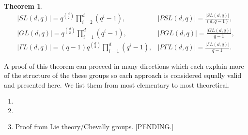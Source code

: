 \documentclass[12pt]{article}
\newtheorem{thm}{Theorem}
\begin{document}
\begin{thm}\label{thm:lin}
\[
\begin{array}{cc}
|SL(d,q)| = q^{\binom{d}{2}} \prod_{i=2}^d (q^i-1), 
  & |PSL(d,q)|=\frac{|SL(d,q)|}{(d,q-1)},\\
|GL(d,q)|  =  q^{\binom{d}{2}} \prod_{i=1}^d (q^i-1), 
  & |PGL(d,q)|=\frac{|GL(d,q)|}{q-1},\\
|\Gamma L(d,q)|  =  (q-1) q^{\binom{d}{2}} \prod_{i=1}^d (q^i-1),
  & |P\Gamma L(d,q)|=\frac{|\Gamma L(d,q)|}{q-1}.
\end{array}
\]
\end{thm}

A proof of this theorem can proceed in many directions which each explain more of the structure of the these groups so each approach is considered equally valid and presented here.  We list them from most elementary to most theoretical.
\begin{enumerate}
\item {}
\item {}
\item Proof from Lie theory/Chevally groups. [PENDING.]
\end{enumerate}

\end{document}

